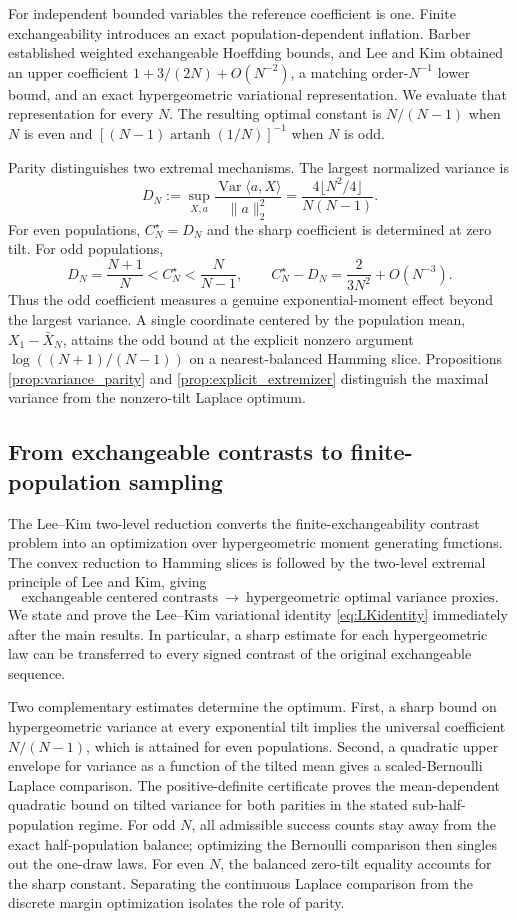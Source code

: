 \documentclass[11pt,a4paper]{article}
\DeclareMathOperator{\Var}{Var}\DeclareMathOperator{\Cov}{Cov}\DeclareMathOperator{\Hyp}{Hyp}\DeclareMathOperator{\Bern}{Bern}\DeclareMathOperator{\supp}{supp}\DeclareMathOperator{\artanh}{artanh}
\begin{document}
For independent bounded variables the reference coefficient is one. Finite exchangeability introduces an exact population-dependent inflation. Barber \cite{Barber,BarberErratum} established weighted exchangeable Hoeffding bounds, and Lee and Kim \cite{LeeKim} obtained an upper coefficient $1+3/(2N)+O(N^{-2})$, a matching order-$N^{-1}$ lower bound, and an exact hypergeometric variational representation. We evaluate that representation for every $N$. The resulting optimal constant is $N/(N-1)$ when $N$ is even and $[(N-1)\operatorname{artanh}(1/N)]^{-1}$ when $N$ is odd.

Parity distinguishes two extremal mechanisms. The largest normalized variance is
\[
 D_N:=\sup_{X,a}\frac{\Var\langle a,X\rangle}{\|a\|_2^2}
 =\frac{4\lfloor N^2/4\rfloor}{N(N-1)}.
\]
For even populations, $C_N^\star=D_N$ and the sharp coefficient is determined at zero tilt. For odd populations,
\[
 D_N=\frac{N+1}{N}<C_N^\star<\frac{N}{N-1},
 \qquad C_N^\star-D_N=\frac{2}{3N^2}+O(N^{-3}).
\]
Thus the odd coefficient measures a genuine exponential-moment effect beyond the largest variance. A single coordinate centered by the population mean, $X_1-\bar X_N$, attains the odd bound at the explicit nonzero argument $\log((N+1)/(N-1))$ on a nearest-balanced Hamming slice. Propositions \ref{prop:variance_parity} and \ref{prop:explicit_extremizer} distinguish the maximal variance from the nonzero-tilt Laplace optimum.

\subsection{From exchangeable contrasts to finite-population sampling}
The Lee--Kim two-level reduction converts the finite-exchangeability contrast problem into an optimization over hypergeometric moment generating functions. The convex reduction to Hamming slices is followed by the two-level extremal principle of Lee and Kim, giving
\[
 \text{exchangeable centered contrasts}\ \longrightarrow\
 \text{hypergeometric optimal variance proxies}.
\]
We state and prove the Lee--Kim variational identity \eqref{eq:LKidentity} immediately after the main results. In particular, a sharp estimate for each hypergeometric law can be transferred to every signed contrast of the original exchangeable sequence.

Two complementary estimates determine the optimum. First, a sharp bound on hypergeometric variance at every exponential tilt implies the universal coefficient $N/(N-1)$, which is attained for even populations. Second, a quadratic upper envelope for variance as a function of the tilted mean gives a scaled-Bernoulli Laplace comparison. The positive-definite certificate proves the mean-dependent quadratic bound on tilted variance for both parities in the stated sub-half-population regime. For odd $N$, all admissible success counts stay away from the exact half-population balance; optimizing the Bernoulli comparison then singles out the one-draw laws. For even $N$, the balanced zero-tilt equality accounts for the sharp constant. Separating the continuous Laplace comparison from the discrete margin optimization isolates the role of parity.
\end{document}
